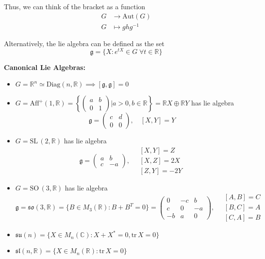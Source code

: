 \documentclass[12pt]{article}
\newcommand{\R}{\mathbb{R}}
\newcommand{\C}{\mathbb{C}}
\newcommand{\SL}{\text{SL}\,}
\newcommand{\SO}{\text{SO}\,}
\newcommand{\tr}{\text{tr}\,}
\newcommand{\g}{\mathfrak{g}}
\renewcommand{\sl}{\mathfrak{sl}}
\newcommand{\so}{\mathfrak{so}}
\newcommand{\Aut}{\text{Aut}}
\begin{document}
Thus, we can think of the bracket as a function 
\begin{align*}
    G &\to \Aut(G)\\ 
    G&\mapsto ghg^{-1}
\end{align*}

Alternatively, the lie algebra can be defined as the set 
\[\g = \{X: e^{tX} \in G \; \forall t \in \R\}\]

\textbf{Canonical Lie Algebras:}
\begin{itemize}
    \item $G = \R^n \simeq \text{Diag}(n, \R) \implies [\g, \g] = 0$ 
    \item $G = \text{Aff}^+(1, \R) = \left\{\begin{pmatrix}
        a & b\\ 
        0 & 1
    \end{pmatrix} \bigg\vert a >0, b \in \R\right\} = \R X \oplus \R Y$ has lie algebra 
    \[\g = \begin{pmatrix}
        c & d\\ 
        0 & 0
    \end{pmatrix}, \quad [X, Y] = Y\]
    \item $G = \SL(2, \R)$ has lie algebra 
    \[\g = \begin{pmatrix}
        a & b\\ 
        c & -a
    \end{pmatrix}, \quad \begin{array}{l}
        \mbox{$[X, Y] = Z$}\\ 
        \mbox{$[X, Z] = 2X$}\\ 
        \mbox{$[Z, Y] = -2Y$}
    \end{array}\]
    \item $G = \SO(3, \R)$ has lie algebra
    \[\g = \so(3, \R) = \{B \in M_3(\R) : B + B^T = 0\} = \begin{pmatrix}
        0 & -c & b\\ 
        c & 0 & -a\\ 
        -b & a & 0
    \end{pmatrix}, \quad \begin{array}{l}
        \mbox{$[A, B] = C$}\\ 
        \mbox{$[B, C] = A$}\\ 
        \mbox{$[C, A] = B$}
    \end{array}\]
    \item $\mathfrak{su}(n) = \{X \in M_n(\C): X + X^* = 0, \tr X = 0\}$ 
    \item $\sl(n, \R) = \{X \in M_n(\R): \tr X = 0\}$

\end{itemize}
\end{document}
